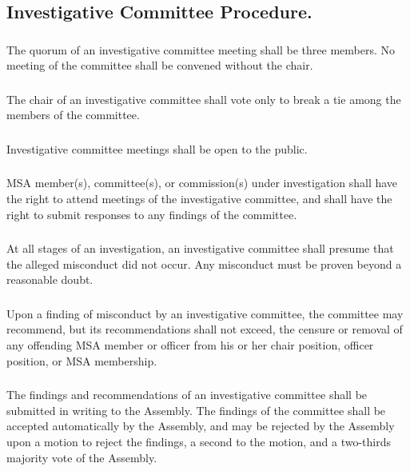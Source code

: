 \documentclass{rules}
\begin{document}
\subsection{Investigative Committee Procedure.}
\subsubsection{}
The quorum of an investigative committee meeting shall be three members.  No meeting of the committee shall be convened without the chair.
\subsubsection{}
The chair of an investigative committee shall vote only to break a tie among the members of the committee.
\subsubsection{}
Investigative committee meetings shall be open to the public.
\subsubsection{}
MSA member(s), committee(s), or commission(s) under investigation shall have the right to attend meetings of the investigative committee, and shall have the right to submit responses to any findings of the committee.
\subsubsection{}
At all stages of an investigation, an investigative committee shall presume that the alleged misconduct did not occur.  Any misconduct must be proven beyond a reasonable doubt.
\subsubsection{}
Upon a finding of misconduct by an investigative committee, the committee may recommend, but its recommendations shall not exceed, the censure or removal of any offending MSA member or officer from his or her chair position, officer position, or MSA membership.
\subsubsection{}
The findings and recommendations of an investigative committee shall be submitted in writing to the Assembly.  The findings of the committee shall be accepted automatically by the Assembly, and may be rejected by the Assembly upon a motion to reject the findings, a second to the motion, and a two-thirds majority vote of the Assembly.
\end{document}
